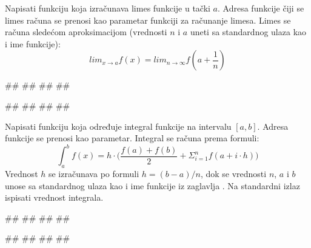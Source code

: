 \begin{Exercise}[label=2_28]
Napisati funkciju koja izračunava limes funkcije  u   
tački $a$. Adresa funkcije  čiji se limes računa
se prenosi kao parametar funkciji za računanje limesa.  Limes se
računa sledećom aproksimacijom (vrednosti $n$ i $a$ uneti sa
standardnog ulaza kao i ime funkcije):
$$ lim_{x \rightarrow a} f(x) = lim_{n \rightarrow \infty} f(a + \frac{1}{n})$$

\begin{miditest}
\begin{upotreba}{1}
#\naslovInt#
##
##
##
\end{upotreba}
\end{miditest}
\begin{miditest}
\begin{upotreba}{2}
#\naslovInt#
##
##
##
\end{upotreba}
\end{miditest}
\end{Exercise}

\begin{Exercise}[label=2_29]
Napisati funkciju koja određuje integral funkcije  na
intervalu $[a, b]$.  Adresa funkcije  se prenosi kao
parametar. Integral se računa prema formuli:
$$ \int_{a}^{b} f(x) = h \cdot \bigg(\frac{f(a)+f(b)}{2} + \Sigma_{i=1}^{n}
f(a+i \cdot h)\bigg)$$ 
Vrednost $h$ se izračunava po formuli $h = (b-a)/n$, dok se vrednosti $n$, $a$ i $b$ unose sa standardnog
ulaza kao i ime funkcije iz zaglavlja
. Na standardni izlaz ispisati vrednost integrala.

\begin{miditest}
\begin{upotreba}{1}
#\naslovInt#
##
##
##
\end{upotreba}
\end{miditest}
\begin{miditest}
\begin{upotreba}{1}
#\naslovInt#
##
##
##
\end{upotreba}
\end{miditest}
\end{Exercise}

